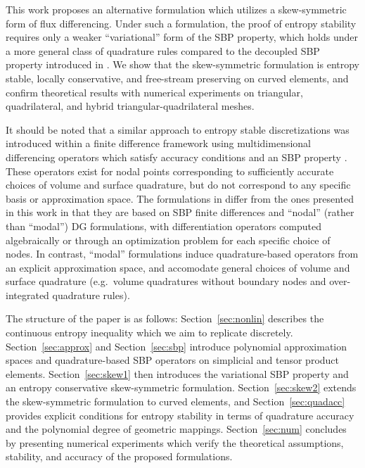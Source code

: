 \documentclass{svjour3}                     %
\begin{document}
This work proposes an alternative formulation which utilizes a skew-symmetric form of flux differencing.  Under such a formulation, the proof of entropy stability requires only a weaker ``variational'' form of the SBP property, which holds under a more general class of quadrature rules compared to the decoupled SBP property introduced in \cite{chan2017discretely, chan2018discretely}.  We show that the skew-symmetric formulation is entropy stable, locally conservative, and free-stream preserving on curved elements, and confirm theoretical results with numerical experiments on triangular, quadrilateral, and hybrid triangular-quadrilateral meshes.  

It should be noted that a similar approach to entropy stable discretizations was introduced within a finite difference framework \cite{chen2017entropy, crean2018entropy} using multidimensional differencing operators which satisfy accuracy conditions and an SBP property \cite{hicken2016multidimensional}.  These operators exist for nodal points corresponding to sufficiently accurate choices of volume and surface quadrature, but do not correspond to any specific basis or approximation space.  The formulations in \cite{chen2017entropy, crean2018entropy} differ from the ones presented in this work in that they are based on SBP finite differences and ``nodal'' (rather than ``modal'') DG formulations, with differentiation operators computed algebraically or through an optimization problem for each specific choice of nodes.  In contrast, ``modal'' formulations induce quadrature-based operators from an explicit approximation space, and accomodate general choices of volume and surface quadrature (e.g.\ volume quadratures without boundary nodes and over-integrated quadrature rules).  

The structure of the paper is as follows: Section~\ref{sec:nonlin} describes the continuous entropy inequality which we aim to replicate discretely.  Section~\ref{sec:approx} and Section~\ref{sec:sbp} introduce polynomial approximation spaces and quadrature-based SBP operators on simplicial and tensor product elements.  Section~\ref{sec:skew1} then introduces the variational SBP property and an entropy conservative skew-symmetric formulation.  Section~\ref{sec:skew2} extends the skew-symmetric formulation to curved elements, and Section~\ref{sec:quadacc} provides explicit conditions for entropy stability in terms of quadrature accuracy and the polynomial degree of geometric mappings.  Section~\ref{sec:num} concludes by presenting numerical experiments which verify the theoretical assumptions, stability, and accuracy of the proposed formulations.
\end{document}
